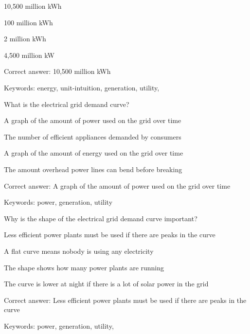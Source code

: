 \begin{answer}
	\item 10,500 million kWh
	\item 100 million kWh
	\item 2 million kWh
	\item 4,500 million kW
\end{answer}

Correct answer: 10,500 million kWh

Keywords: energy, unit-intuition, generation, utility, \Hawaii

\begin{question}
	\item What is the electrical grid demand curve?
\end{question}

\begin{answer}
	\item A graph of the amount of power used on the grid over time
	\item The number of efficient appliances demanded by consumers
	\item A graph of the amount of energy used on the grid over time
	\item The amount overhead power lines can bend before breaking
\end{answer}

Correct answer: A graph of the amount of power used on the grid over time

Keywords: power, generation, utility

\begin{question}
	\item Why is the shape of the electrical grid demand curve important?
\end{question}

\begin{answer}
	\item Less efficient power plants must be used if there are peaks in the curve 
	\item A flat curve means nobody is using any electricity
	\item The shape shows how many power plants are running
	\item The curve is lower at night if there is a lot of solar power in the grid
\end{answer}

Correct answer: Less efficient power plants must be used if there are peaks in the curve

Keywords: power, generation, utility, \Hawaii

